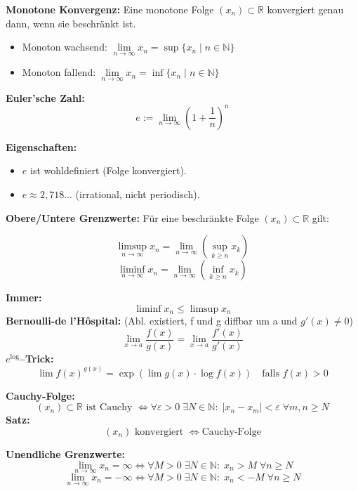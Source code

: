 \textbf{Monotone Konvergenz:}  
Eine monotone Folge \( (x_n) \subset \mathbb{R} \) konvergiert genau dann, wenn sie beschränkt ist.

\begin{itemize}
  \item Monoton wachsend:  
  \( \lim\limits_{n \to \infty} x_n = \sup \{ x_n \mid n \in \mathbb{N} \} \)

  \item Monoton fallend:  
  \( \lim\limits_{n \to \infty} x_n = \inf \{ x_n \mid n \in \mathbb{N} \} \)
\end{itemize}

\textbf{Euler'sche Zahl:}  
\[
e := \lim\limits_{n \to \infty} \left( 1 + \frac{1}{n} \right)^n
\]

\textbf{Eigenschaften:}
\begin{itemize}
  \item \( e \) ist wohldefiniert (Folge konvergiert).
  \item \( e \approx 2{,}718\ldots \) (irrational, nicht periodisch).
\end{itemize}

\textbf{Obere/Untere Grenzwerte:}  
Für eine beschränkte Folge \( (x_n) \subset \mathbb{R} \) gilt:

\[
\limsup\limits_{n \to \infty} x_n = \lim\limits_{n \to \infty} \left( \sup_{k \geq n} x_k \right)
\]
\[
\liminf\limits_{n \to \infty} x_n = \lim\limits_{n \to \infty} \left( \inf_{k \geq n} x_k \right)
\]

\textbf{Immer:}  
\[
\liminf x_n \leq \limsup x_n
\]
\textbf{Bernoulli-de l'Hôspital:} (Abl. existiert, f und g diffbar um a und $g'(x) \not = 0$)
\[
\lim\limits_{x \to a} \frac{f(x)}{g(x)} = \lim\limits_{x \to a} \frac{f'(x)}{g'(x)}
\]
\textbf{\( e^{\log} \)–Trick:}  
\[
\lim f(x)^{g(x)} = \exp\left( \lim g(x) \cdot \log f(x) \right)
\quad \text{falls } f(x) > 0
\]

\textbf{Cauchy-Folge:}  
\[
(x_n) \subset \mathbb{R} \text{ ist Cauchy } \Leftrightarrow  
\forall \varepsilon > 0\; \exists N \in \mathbb{N}:\; |x_n - x_m| < \varepsilon \; \forall m,n \geq N
\]
\textbf{Satz:}  
\[
(x_n) \text{ konvergiert } \Leftrightarrow \text{Cauchy-Folge}
\]

\textbf{Unendliche Grenzwerte:}  
\[
\lim_{n \to \infty} x_n = \infty \Leftrightarrow  
\forall M > 0\; \exists N \in \mathbb{N}:\; x_n > M\; \forall n \geq N
\]
\[
\lim_{n \to \infty} x_n = -\infty \Leftrightarrow  
\forall M > 0\; \exists N \in \mathbb{N}:\; x_n < -M\; \forall n \geq N
\]


